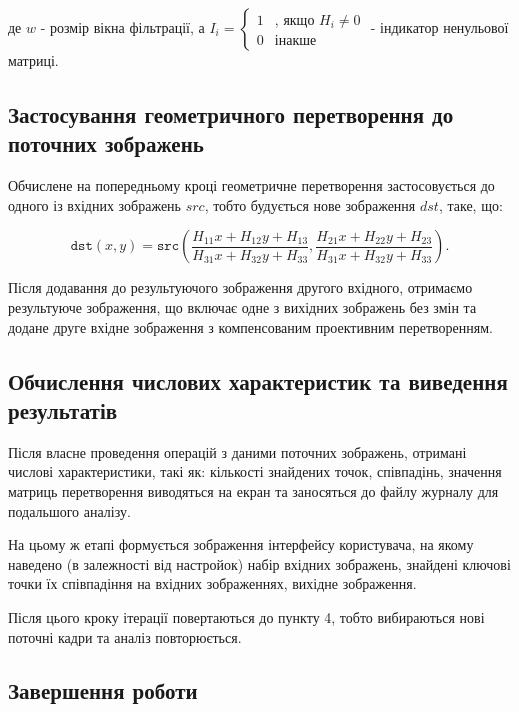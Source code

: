 де $w$ - розмір вікна фільтрації, а $I_i = \begin{cases} 1 & \text{, якщо $H_i \neq 0$} \\ 0 & \text{інакше}\end{cases} $ - індикатор ненульової матриці.

\subsection{Застосування геометричного перетворення до поточних зображень}

Обчислене на попередньому кроці геометричне перетворення застосовується до одного із вхідних зображень $src$, тобто будується нове зображення $dst$, таке, що:

\begin{equation}
  \texttt{dst} (x,y) =  \texttt{src} \left ( \frac{H_{11} x + H_{12} y + H_{13}}{H_{31} x + H_{32} y + H_{33}} ,     \frac{H_{21} x + H_{22} y + H_{23}}{H_{31} x + H_{32} y + H_{33}} \right ).
\end{equation}

Після додавання до результуючого зображення другого вхідного, отримаємо результуюче зображення, що включає одне з вихідних зображень без змін та додане друге вхідне зображення з компенсованим проективним перетворенням. 

\subsection{Обчислення числових характеристик та виведення результатів}

Після власне проведення операцій з даними поточних зображень, отримані числові характеристики, такі як: кількості знайдених точок, співпадінь, значення матриць перетворення виводяться на екран та заносяться до файлу журналу для подальшого аналізу.

На цьому ж етапі формується зображення інтерфейсу користувача, на якому наведено (в залежності від настройок) набір вхідних зображень, знайдені ключові точки їх співпадіння на вхідних зображеннях, вихідне зображення.

Після цього кроку ітерації повертаються до пункту 4, тобто вибираються нові поточні кадри та аналіз повторюється.

\subsection{Завершення роботи}


